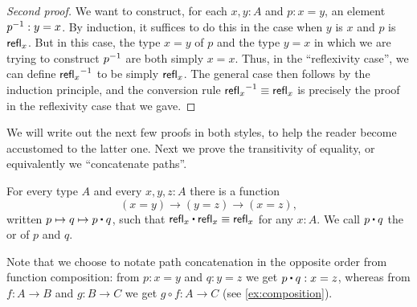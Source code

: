 \begin{proof}[Second proof]
  We want to construct, for each $x,y:A$ and $p:x=y$, an element $\mathord{{p}^{-1}}:y=x$.
  By induction, it suffices to do this in the case when $y$ is $x$ and $p$ is $\mathsf{refl}_{x}$.
  But in this case, the type $x=y$ of $p$ and the type $y=x$ in which we are trying to construct $\mathord{{p}^{-1}}$ are both simply $x=x$.
  Thus, in the ``reflexivity case'', we can define $\mathord{{\mathsf{refl}_{x}}^{-1}}$ to be simply $\mathsf{refl}_{x}$.
  The general case then follows by the induction principle, and the conversion rule $\mathord{{\mathsf{refl}_{x}}^{-1}}\equiv\mathsf{refl}_{x}$ is precisely the proof in the reflexivity case that we gave.
\end{proof}

We will write out the next few proofs in both styles, to help the reader become accustomed to the latter one.
Next we prove the transitivity of equality, or equivalently we ``concatenate paths''.

\begin{lem}\label{lem:concat}
  For every type $A$ and every $x,y,z:A$ there is a function
  \begin{equation*}
  (x= y) \to   (y= z)\to (x=  z),
  \end{equation*}
  written $p \mapsto q \mapsto p\ct q$, such that $\refl{x}\ct \refl{x}\jdeq \refl{x}$ for any $x:A$.
  We call $p\ct q$ the  or  of $p$ and $q$.
\end{lem}

Note that we choose to notate path concatenation in the opposite order from function composition: from $p:x=y$ and $q:y=z$ we get $p\ct q : x=z$, whereas from $f:A\to B$ and $g:B\to C$ we get $g\circ f : A\to C$ (see \cref{ex:composition}).

